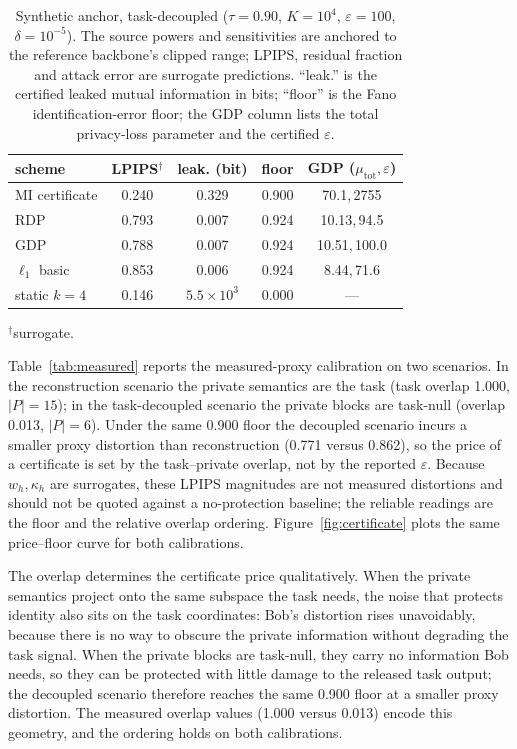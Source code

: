 \documentclass[10pt,twocolumn,letterpaper]{article}
\theoremstyle{plain}
\theoremstyle{definition}
\begin{document}
\begin{table}[t]
\centering\footnotesize
\setlength{\tabcolsep}{3.5pt}
\caption{Synthetic anchor, task-decoupled ($\tau{=}0.90$, $K{=}10^{4}$,
$\varepsilon{=}100$, $\delta{=}10^{-5}$). The source powers and sensitivities
are anchored to the reference backbone's clipped range; LPIPS, residual
fraction and attack error are surrogate predictions. ``leak.'' is the certified
leaked mutual information in bits; ``floor'' is the Fano identification-error
floor; the GDP column lists the total privacy-loss parameter and the certified
$\varepsilon$.}
\label{tab:synthetic}
\begin{tabular}{lcccc}
\toprule
scheme & LPIPS$^\dagger$ & leak. (bit) & floor & GDP ($\mu_{\mathrm{tot}},\varepsilon$) \\
\midrule
MI certificate & 0.240 & 0.329 & 0.900 & 70.1,\,2755 \\
RDP & 0.793 & 0.007 & 0.924 & 10.13,\,94.5 \\
GDP & 0.788 & 0.007 & 0.924 & 10.51,\,100.0 \\
$\ell_1$ basic & 0.853 & 0.006 & 0.924 & 8.44,\,71.6 \\
static $k{=}4$ & 0.146 & $5.5\times10^{3}$ & 0.000 & --- \\
\bottomrule
\end{tabular}
$^\dagger$surrogate.
\end{table}

Table~\ref{tab:measured} reports the measured-proxy calibration on two
scenarios. In the reconstruction scenario the private semantics are the task
(task overlap 1.000, $|P|=15$); in the task-decoupled scenario the private
blocks are task-null (overlap 0.013, $|P|=6$). Under the same 0.900 floor the
decoupled scenario incurs a smaller proxy distortion than reconstruction
(0.771 versus 0.862), so the price of a certificate is set by the
task--private overlap, not by the reported $\varepsilon$. Because $w_h,\kappa_h$
are surrogates, these LPIPS magnitudes are not measured distortions and should
not be quoted against a no-protection baseline; the reliable readings are the
floor and the relative overlap ordering. Figure~\ref{fig:certificate}
plots the same price--floor curve for both calibrations.

The overlap determines the certificate price qualitatively. When the private
semantics project onto the same subspace the task needs, the noise that
protects identity also sits on the task coordinates: Bob's distortion rises
unavoidably, because there is no way to obscure the private information without
degrading the task signal. When the private blocks are task-null, they carry
no information Bob needs, so they can be protected with little damage to the
released task output; the decoupled scenario therefore reaches the same
0.900 floor at a smaller proxy distortion. The measured overlap values
(1.000 versus 0.013) encode this geometry, and the ordering holds on both
calibrations.
\end{document}
